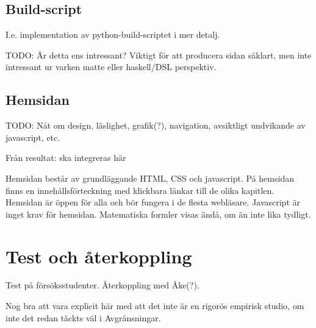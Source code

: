 \begin{binge}
  \subsection{Build-script}

  I.e. implementation av python-build-scriptet i mer detalj.

  TODO: Är detta ens intressant? Viktigt för att producera sidan såklart, men
  inte intressant ur varken matte eller haskell/DSL perspektiv.

  \subsection{Hemsidan}

  TODO: Nåt om design, läslighet, grafik(?), navigation, avsiktligt undvikande
  av javascript, etc.

Från resultat: ska integreras här

Hemsidan består av grundläggande HTML, CSS och javascript. På hemsidan finns en innehållsförteckning med klickbara länkar till de olika kapitlen. Hemsidan är öppen för alla och bör fungera i de flesta webläsare. Javascript är inget krav för hemsidan. Matematiska formler visas ändå, om än inte lika tydligt.

  \section{Test och återkoppling}


  Test på försöksstudenter. Återkoppling med Åke(?).

  Nog bra att vara explicit här med att det inte är en rigorös empirisk
  studio, om inte det redan täckts väl i Avgränsningar.

\end{binge}
